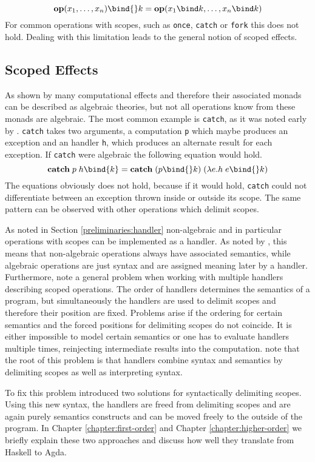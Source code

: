 \[
  \mathbf{op}(x_1,\dots ,x_n) \bind{} k = \mathbf{op}(x_1\bind k,\dots
  ,x_n\bind k)
\]
For common operations with scopes, such as \texttt{once}, \texttt{catch} or
\texttt{fork} this does not hold.
Dealing with this limitation leads to the general notion of scoped effects.


\subsection{Scoped Effects}
\label{preliminaries:scoped-effects}

As shown by \textcite{DBLP:conf/fossacs/PlotkinP02} many computational effects
and therefore their associated monads can be described as algebraic theories,
but not all operations know from these monads are algebraic.
The most common example is \texttt{catch}, as it was noted early by
\textcite{DBLP:journals/acs/PlotkinP03}.
\texttt{catch} takes two arguments, a computation \texttt{p} which maybe
produces an exception and an handler \texttt{h}, which produces an alternate
result for each exception.
If \texttt{catch} were algebraic the following equation would hold.
\[
  \textbf{catch}\; p\; h \bind{k} = \textbf{catch}\;(p\bind{} k)\;(\lambda
  e.h\; e \bind{} k)
\]
The equations obviously does not hold, because if it would hold, \texttt{catch}
could not differentiate between an exception thrown inside or outside its scope.
The same pattern can be observed with other operations which delimit scopes.

As noted in Section \ref{preliminaries:handler} non-algebraic and in particular
operations with scopes can be implemented as a handler.
As noted by \textcite{DBLP:conf/lics/PirogSWJ18}, this means that non-algebraic
operations always have associated semantics, while algebraic operations are just
syntax and are assigned meaning later by a handler.
Furthermore, \textcite{DBLP:conf/haskell/WuSH14} note a general problem when
working with multiple handlers describing scoped operations.
The order of handlers determines the semantics of a program, but simultaneously
the handlers are used to delimit scopes and therefore their position are fixed.
Problems arise if the ordering for certain semantics and the forced positions
for delimiting scopes do not coincide.
It is either impossible to model certain semantics or one has to evaluate
handlers multiple times, reinjecting intermediate results into the
computation.
\textcite{DBLP:conf/haskell/WuSH14} note that the root of this problem is that
handlers combine syntax and semantics by delimiting scopes as well as
interpreting syntax.

To fix this problem \textcite{DBLP:conf/haskell/WuSH14} introduced two solutions
for syntactically delimiting scopes.
Using this new syntax, the handlers are freed from delimiting scopes and are
again purely semantics constructs and can be moved freely to the outside of the
program.
In Chapter \ref{chapter:first-order} and Chapter \ref{chapter:higher-order} we
briefly explain these two approaches and discuss how well they translate from
Haskell to Agda.

